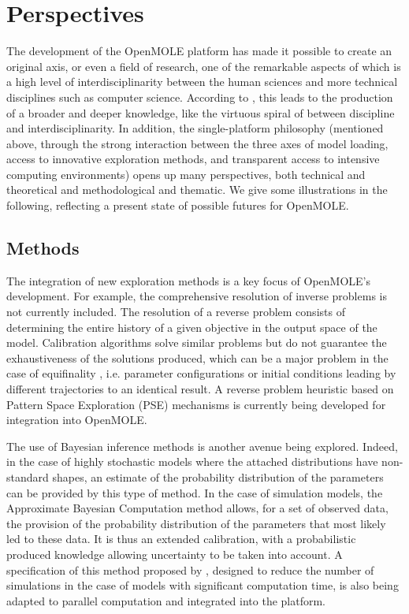 \documentclass[10pt]{article}
\begin{document}
\section{Perspectives}

The development of the OpenMOLE platform has made it possible to create an original axis, or even a field of research, one of the remarkable aspects of which is a high level of interdisciplinarity between the human sciences and more technical disciplines such as computer science. According to \cite{banos2017knowledge}, this leads to the production of a broader and deeper knowledge, like the virtuous spiral of \cite{banos2013pour} between discipline and interdisciplinarity. In addition, the single-platform philosophy (mentioned above, through the strong interaction between the three axes of model loading, access to innovative exploration methods, and transparent access to intensive computing environments) opens up many perspectives, both technical and theoretical and methodological and thematic. We give some illustrations in the following, reflecting a present state of possible futures for OpenMOLE.

\subsection{Methods}

The integration of new exploration methods is a key focus of OpenMOLE’s development. For example, the comprehensive resolution of inverse problems \citep{aster2018parameter} is not currently included. The resolution of a reverse problem consists of determining the entire history of a given objective in the output space of the model. Calibration algorithms solve similar problems but do not guarantee the exhaustiveness of the solutions produced, which can be a major problem in the case of equifinality \citep{rey2015plateforme}, i.e. parameter configurations or initial conditions leading by different trajectories to an identical result. A reverse problem heuristic based on Pattern Space Exploration (PSE) mechanisms is currently being developed for integration into OpenMOLE.

The use of Bayesian inference methods is another avenue being explored. Indeed, in the case of highly stochastic models where the attached distributions have non-standard shapes, an estimate of the probability distribution of the parameters can be provided by this type of method. In the case of simulation models, the Approximate Bayesian Computation method \citep{csillery2010approximate} allows, for a set of observed data, the provision of the probability distribution of the parameters that most likely led to these data. It is thus an extended calibration, with a probabilistic produced knowledge allowing uncertainty to be taken into account. A specification of this method proposed by \cite{lenormand2013adaptive}, designed to reduce the number of simulations in the case of models with significant computation time, is also being adapted to parallel computation and integrated into the platform.
\end{document}
